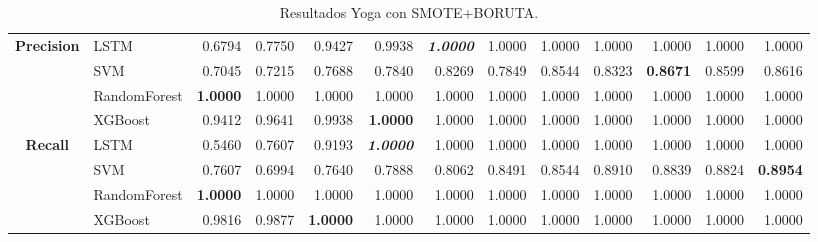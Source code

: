 \begin{table}[H]
\begin{adjustbox}{max width=12cm}
\begin{tabular}{|c|l|r|r|r|r|r|r|r|r|r|r|r|}
			\hline
			\textbf{Precision} &  LSTM &  0.6794 &  0.7750 &  0.9427 &  0.9938 & \textit{ \textbf{  1.0000 } } &  1.0000 &  1.0000 &  1.0000 &  1.0000 &  1.0000 &  1.0000 \\
			&  SVM &  0.7045 &  0.7215 &  0.7688 &  0.7840 &  0.8269 &  0.7849 &  0.8544 &  0.8323 & \textbf{  0.8671 } &  0.8599 &  0.8616 \\
			&  RandomForest & \textbf{  1.0000 } &  1.0000 &  1.0000 &  1.0000 &  1.0000 &  1.0000 &  1.0000 &  1.0000 &  1.0000 &  1.0000 &  1.0000 \\
			&  XGBoost &  0.9412 &  0.9641 &  0.9938 & \textbf{  1.0000 } &  1.0000 &  1.0000 &  1.0000 &  1.0000 &  1.0000 &  1.0000 &  1.0000 \\
			\hline
			\textbf{Recall} &  LSTM &  0.5460 &  0.7607 &  0.9193 & \textit{ \textbf{  1.0000 } } &  1.0000 &  1.0000 &  1.0000 &  1.0000 &  1.0000 &  1.0000 &  1.0000 \\
			&  SVM &  0.7607 &  0.6994 &  0.7640 &  0.7888 &  0.8062 &  0.8491 &  0.8544 &  0.8910 &  0.8839 &  0.8824 & \textbf{  0.8954 } \\
			&  RandomForest & \textbf{  1.0000 } &  1.0000 &  1.0000 &  1.0000 &  1.0000 &  1.0000 &  1.0000 &  1.0000 &  1.0000 &  1.0000 &  1.0000 \\
			&  XGBoost &  0.9816 &  0.9877 & \textbf{  1.0000 } &  1.0000 &  1.0000 &  1.0000 &  1.0000 &  1.0000 &  1.0000 &  1.0000 &  1.0000 \\
			\hline
		\end{tabular}
	\end{adjustbox}
	\caption{Resultados Yoga con SMOTE+BORUTA.}
	\label{tab:Yoga_SMOTE_BORUTA}
\end{table}
